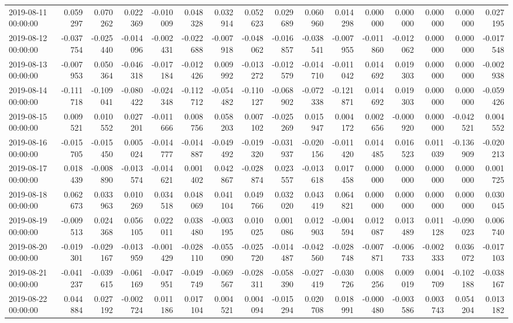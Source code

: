 \begin{tabular}{lrrrrrrrrrrrrrrr}
2019-08-11 00:00:00 & 0.059297 & 0.070262 & 0.022369 & -0.010009 & 0.048328 & 0.032914 & 0.052623 & 0.029689 & 0.060960 & 0.014298 & 0.000000 & 0.000000 & 0.000000 & 0.000000 & 0.027195 \\
2019-08-12 00:00:00 & -0.037754 & -0.025440 & -0.014096 & -0.002431 & -0.022688 & -0.007918 & -0.048062 & -0.016857 & -0.038541 & -0.007955 & -0.011860 & -0.012062 & 0.000000 & 0.000000 & -0.017548 \\
2019-08-13 00:00:00 & -0.007953 & 0.050364 & -0.046318 & -0.017184 & -0.012426 & 0.009992 & -0.013272 & -0.012579 & -0.014710 & -0.011042 & 0.014692 & 0.019303 & 0.000000 & 0.000000 & -0.002938 \\
2019-08-14 00:00:00 & -0.111718 & -0.109041 & -0.080422 & -0.024348 & -0.112712 & -0.054482 & -0.110127 & -0.068902 & -0.072338 & -0.121871 & 0.014692 & 0.019303 & 0.000000 & 0.000000 & -0.059426 \\
2019-08-15 00:00:00 & 0.009521 & 0.010552 & 0.027201 & -0.011666 & 0.008756 & 0.058203 & 0.007102 & -0.025269 & 0.015947 & 0.004172 & 0.002656 & -0.000920 & 0.000000 & -0.042521 & 0.004552 \\
2019-08-16 00:00:00 & -0.015705 & -0.015450 & 0.005024 & -0.014777 & -0.014887 & -0.049492 & -0.019320 & -0.031937 & -0.020156 & -0.011420 & 0.014485 & 0.016523 & 0.011039 & -0.136909 & -0.020213 \\
2019-08-17 00:00:00 & 0.018439 & -0.008890 & -0.013574 & -0.014621 & 0.001402 & 0.042867 & -0.028874 & 0.023557 & -0.013618 & 0.017458 & 0.000000 & 0.000000 & 0.000000 & 0.000000 & 0.001725 \\
2019-08-18 00:00:00 & 0.062673 & 0.033963 & 0.010269 & 0.034518 & 0.048069 & 0.041104 & 0.049766 & 0.032020 & 0.043419 & 0.064821 & 0.000000 & 0.000000 & 0.000000 & 0.000000 & 0.030045 \\
2019-08-19 00:00:00 & -0.009513 & 0.024368 & 0.056105 & 0.022011 & 0.038480 & -0.003195 & 0.010025 & 0.001086 & 0.012903 & -0.004594 & 0.012087 & 0.013489 & 0.011128 & -0.090023 & 0.006740 \\
2019-08-20 00:00:00 & -0.019301 & -0.029167 & -0.013959 & -0.001429 & -0.028110 & -0.055090 & -0.025720 & -0.014487 & -0.042560 & -0.028748 & -0.007871 & -0.006733 & -0.002333 & 0.036072 & -0.017103 \\
2019-08-21 00:00:00 & -0.041237 & -0.039615 & -0.061169 & -0.047951 & -0.049749 & -0.069567 & -0.028311 & -0.058390 & -0.027419 & -0.030726 & 0.008256 & 0.009019 & 0.004709 & -0.102188 & -0.038167 \\
2019-08-22 00:00:00 & 0.044884 & 0.027192 & -0.002724 & 0.011186 & 0.017104 & 0.004521 & 0.004094 & -0.015294 & 0.020708 & 0.018991 & -0.000480 & -0.003586 & 0.003743 & 0.054204 & 0.013182 \\

\end{tabular}
